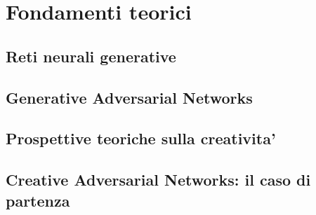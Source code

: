 \chapter{Fondamenti teorici}
\label{cap:fondamenti}


\section{Reti neurali generative}
\label{sec:reti-generative}

\section{Generative Adversarial Networks}
\label{sec:gan}

\section{Prospettive teoriche sulla creativita'}
\label{sec:teoria-creativita}

\section{Creative Adversarial Networks: il caso di partenza}
\label{sec:can}
